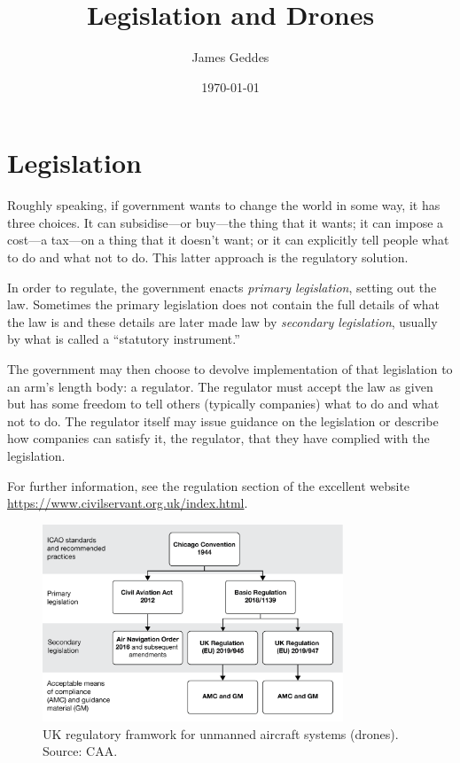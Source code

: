 \documentclass[12pt, a4paper]{article}
\title{Legislation and Drones}
\author{James Geddes}
\date{\today}
\begin{document}
\maketitle
\tableofcontents

\section{Legislation}

Roughly speaking, if government wants to change the world in some way,
it has three choices. It can subsidise---or buy---the thing that it wants;
it can impose a cost---a tax---on a thing that it doesn't want; or it can
explicitly tell people what to do and what not to do. This latter
approach is the regulatory solution.

In order to regulate, the government enacts \emph{primary
  legislation}, setting out the law. Sometimes the primary legislation
does not contain the full details of what the law is and these details
are later made law by \emph{secondary legislation}, usually by what is
called a ``statutory instrument.''

The government may then choose to devolve implementation of that
legislation to an arm's length body: a regulator. The regulator must
accept the law as given but has some freedom to tell others (typically
companies) what to do and what not to do. The regulator itself may
issue guidance on the legislation or describe how companies can
satisfy it, the regulator, that they have complied with the
legislation.

For further information, see the regulation section of the excellent
website \url{https://www.civilservant.org.uk/index.html}.

\begin{figure}[ht]
  \centering
  \includegraphics[width=0.8\textwidth]{figures/uk-uas-regulatory-framework.png}
  \caption{UK regulatory framwork for unmanned aircraft systems
    (drones). Source: CAA.\label{fig:drones}}
\end{figure}
\end{document}
